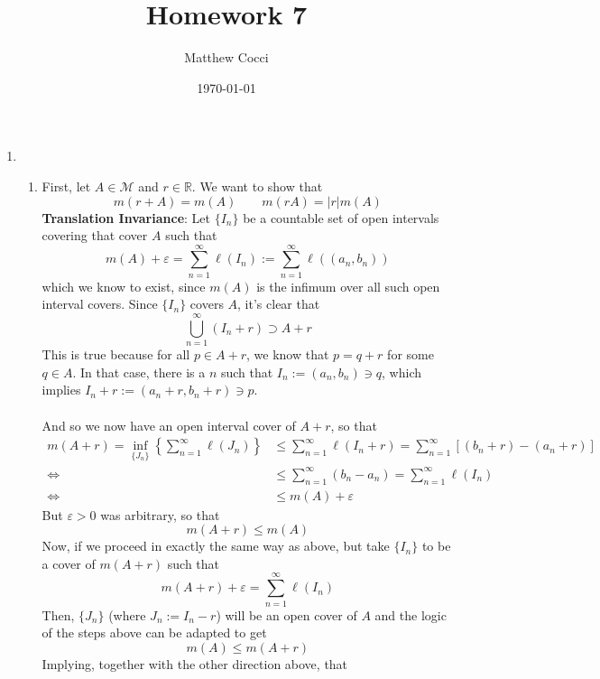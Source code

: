 \documentclass[12pt]{article}
\author{Matthew Cocci}
\title{\textbf{Homework 7}}
\date{\today}
\theoremstyle{plain}
\theoremstyle{definition}
\theoremstyle{remark}
\begin{document}
\maketitle 

\begin{enumerate} 

\item 
    
\begin{enumerate} 

\item 
First, let $A\in\mathscr{M}$ and $r\in\mathbb{R}$. We want to show that 
\[
    m(r+A) = m(A) \qquad m(rA) = |r|m(A)
\]
\textbf{Translation Invariance}: Let $\{I_n\}$ be a countable set of open intervals covering that cover $A$ such that
\[
    m(A) + \varepsilon = \sum^\infty_{n=1} \ell(I_n) := 
    \sum^\infty_{n=1} \ell((a_n, b_n))
\]
which we know to exist, since $m(A)$ is the infimum over all such open interval covers. Since $\{I_n\}$ covers $A$, it's clear that
\[
    \bigcup^\infty_{n=1} (I_n + r) \supset A+r
\]
This is true because for all $p\in A+r$, we know that $p=q+r$ for some $q\in A$. In that case, there is a $n$ such that $I_n:=(a_n,b_n)\ni q$, which implies $I_n + r := (a_n+r, b_n+r) \ni p$.
\\
\\
And so we now have an open interval cover of $A+r$, so that 
\begin{align*}
    m(A+r) = \inf_{\{J_n\}}
        \left\{\sum^\infty_{n=1} \ell(J_n)\right\}
        &\leq \sum^\infty_{n=1} \ell(I_n + r) 
        = \sum^\infty_{n=1} [(b_n+r)-(a_n+r)] \\
    \Leftrightarrow \qquad
        &\leq \sum^\infty_{n=1} (b_n-a_n) 
        = \sum^\infty_{n=1} \ell(I_n) \\
    \Leftrightarrow \qquad
        &\leq m(A) + \varepsilon
\end{align*}
But $\varepsilon>0$ was arbitrary, so that 
\begin{equation}
    m(A+r) \leq m(A) 
\end{equation}
Now, if we proceed in exactly the same way as above, but take $\{I_n\}$ to be a cover of $m(A+r)$ such that 
\[
    m(A + r) + \varepsilon = \sum^\infty_{n=1} \ell(I_n) 
\]
Then, $\{J_n\}$ (where $J_n:=I_n-r$) will be an open cover of $A$ and the logic of the steps above can be adapted to get
\begin{equation}
    m(A) \leq m(A+r)
\end{equation}
Implying, together with the other direction above, that 

\end{enumerate}
\end{enumerate}
\end{document}
